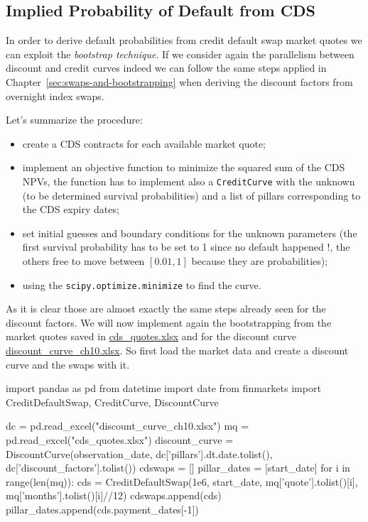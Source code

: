 \subsection{Implied Probability of Default from CDS}\label{default-probabilities-and-cds}

In order to derive default probabilities from credit default swap market quotes we can exploit the \emph{bootstrap technique}. If we consider again the parallelism between discount and credit curves indeed we can follow the same steps applied in Chapter~\ref{sec:swaps-and-bootstrapping}
when deriving the discount factors from overnight index swaps.

Let's summarize the procedure: 
\begin{itemize}
\tightlist
\item create a CDS contracts for each available market quote;
\item implement an objective function to minimize the squared sum of the CDS
	NPVs, the function has to implement also a \texttt{CreditCurve} with
 	the unknown (to be determined survival probabilities) and a list of pillars corresponding to the CDS expiry dates;
\item set initial guesses and boundary conditions for the
	unknown parameters (the first survival probability has to be set to 1
	since no default happened !, the others free to move between $[0.01, 1]$ because they are probabilities);
\item using the \texttt{scipy.optimize.minimize} to find the curve.
\end{itemize}

As it is clear those are almost exactly the same steps already seen for the discount factors.
We will now implement again the bootstrapping from the market quotes saved in \href{https://drive.google.com/file/d/1BOtwCFYk0CUwYkMhnowWTj0HNOpBefd_/view?usp=sharing}{cds\_quotes.xlsx} and for the discount curve \href{https://drive.google.com/file/d/1mugHyet3H9tcSAvYvt8G4_kpfaEbVY7b/view?usp=sharing}{discount\_curve\_ch10.xlsx}.
So first load the market data and create a discount curve and the swaps with it.

\begin{ipython}
import pandas as pd
from datetime import date
from finmarkets import CreditDefaultSwap, CreditCurve, DiscountCurve

dc = pd.read_excel("discount_curve_ch10.xlsx")
mq = pd.read_excel("cds_quotes.xlsx")
discount_curve = DiscountCurve(observation_date,
                 dc['pillars'].dt.date.tolist(),
                 dc['discount_factors'].tolist())
cdswaps = []
pillar_dates = [start_date]
for i in range(len(mq)):
    cds = CreditDefaultSwap(1e6,
          start_date,
          mq['quote'].tolist()[i],
          mq['months'].tolist()[i]//12)
cdswaps.append(cds)
pillar_dates.append(cds.payment_dates[-1])
\end{ipython}

